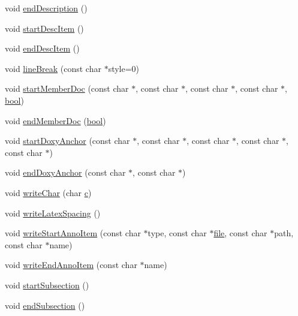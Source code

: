 \begin{DoxyCompactItemize}
\item 
void \hyperlink{class_r_t_f_generator_a4c9b42e803206c575f464d82eec460d9}{end\+Description} ()
\item 
void \hyperlink{class_r_t_f_generator_a39ef721382a2a25ef0a41463a34f1b02}{start\+Desc\+Item} ()
\item 
void \hyperlink{class_r_t_f_generator_aaeb8cbfab437b4198548c4f06dc12847}{end\+Desc\+Item} ()
\item 
void \hyperlink{class_r_t_f_generator_aac2aff06973207c6c7e5b2e5f1984482}{line\+Break} (const char $\ast$style=0)
\item 
void \hyperlink{class_r_t_f_generator_a3284d9085181fa0a6e01c47d0c54073d}{start\+Member\+Doc} (const char $\ast$, const char $\ast$, const char $\ast$, const char $\ast$, \hyperlink{qglobal_8h_a1062901a7428fdd9c7f180f5e01ea056}{bool})
\item 
void \hyperlink{class_r_t_f_generator_abebabde334843d95b88db4521ea89ead}{end\+Member\+Doc} (\hyperlink{qglobal_8h_a1062901a7428fdd9c7f180f5e01ea056}{bool})
\item 
void \hyperlink{class_r_t_f_generator_a502ee48a2bb36ef2f0891dc5e48d30f8}{start\+Doxy\+Anchor} (const char $\ast$, const char $\ast$, const char $\ast$, const char $\ast$, const char $\ast$)
\item 
void \hyperlink{class_r_t_f_generator_a9498b4ab1e6143b700a3ee68e72c39a1}{end\+Doxy\+Anchor} (const char $\ast$, const char $\ast$)
\item 
void \hyperlink{class_r_t_f_generator_a1d1912d4a9d95b54ee88b12b3306e3d2}{write\+Char} (char \hyperlink{060__command__switch_8tcl_ab14f56bc3bd7680490ece4ad7815465f}{c})
\item 
void \hyperlink{class_r_t_f_generator_a1b58b1600ad492690fc1c83b7c6c9803}{write\+Latex\+Spacing} ()
\item 
void \hyperlink{class_r_t_f_generator_a655778fe3ac63c361fa4a349b71a2cc6}{write\+Start\+Anno\+Item} (const char $\ast$type, const char $\ast$\hyperlink{class_output_generator_aed5ad11c3844cdf71ec6fee6c1c84286}{file}, const char $\ast$path, const char $\ast$name)
\item 
void \hyperlink{class_r_t_f_generator_ae39a707b688f116c4e5574b52091af49}{write\+End\+Anno\+Item} (const char $\ast$name)
\item 
void \hyperlink{class_r_t_f_generator_aee4ce8432c14804a99c4422f97b8ae59}{start\+Subsection} ()
\item 
void \hyperlink{class_r_t_f_generator_ae8b39bb99367d13410a574ef93cae773}{end\+Subsection} ()

\end{DoxyCompactItemize}
